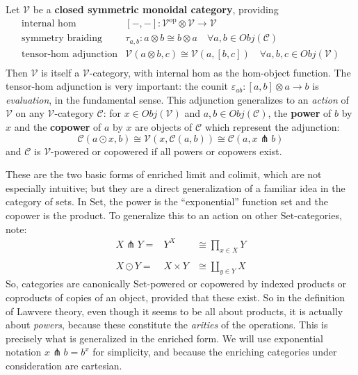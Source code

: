 \documentclass[a4paper,UKenglish]{article}
\theoremstyle{definition}
\newcommand{\Set}{\mathrm{Set}}
\newcommand{\op}{\mathrm{op}}
\newcommand{\V}{\mathscr{V}}
\newcommand{\C}{\mathscr{C}}
\newcommand{\pfk}{\pitchfork}
\begin{document}
Let $\V$ be a \textbf{closed symmetric monoidal category}, providing
\[\begin{array}{rl}
\text{internal hom} & [-,-]:\V^\op\otimes \V \to \V\\
\text{symmetry braiding} & \tau_{a,b}:a\otimes b\cong b\otimes a \quad \forall a,b \in Obj(\C)\\
\text{tensor-hom adjunction} & \V(a\otimes b,c) \cong \V(a,[b,c]) \quad \forall a,b,c \in Obj(\V)\\
\end{array}\]
Then $\V$ is itself a $\V$-category, with internal hom as the hom-object function. The tensor-hom adjunction is very important: the counit $\varepsilon_{ab}: [a,b]\otimes a \to b$ is \textit{evaluation}, in the fundamental sense. This adjunction generalizes to an \textit{action} of $\V$ on any $\V$-category $\C$: for $x \in Obj(\V)$ and $a,b \in Obj(\C)$, the \textbf{power} of $b$ by $x$ and the \textbf{copower} of $a$ by $x$ are objects of $\C$ which represent the adjunction:
$$\C(a\odot x,b) \cong \V(x, \C(a,b)) \cong \C(a,x\pfk b)$$
and $\C$ is $\V$-powered or copowered if all powers or copowers exist.

These are the two basic forms of enriched limit and colimit, which are not especially intuitive; but they are a direct generalization of a familiar idea in the category of sets. In $\Set$, the power is the ``exponential'' function set and the copower is the product. To generalize this to an action on other $\Set$-categories, note:
\[\begin{array}{lcr}
	X \pfk Y = & Y^X & \cong \prod_{x\in X}Y\\
	\\
	X \odot Y = & X \times Y & \cong \coprod_{y\in Y}X
\end{array}\]
So, categories are canonically $\Set$-powered or copowered by indexed products or coproducts of copies of an object, provided that these exist. So in the definition of Lawvere theory, even though it seems to be all about products, it is actually about \textit{powers}, because these constitute the \textit{arities} of the operations. This is precisely what is generalized in the enriched form. We will use exponential notation $x\pfk b = b^x$ for simplicity, and because the enriching categories under consideration are cartesian.
\end{document}
